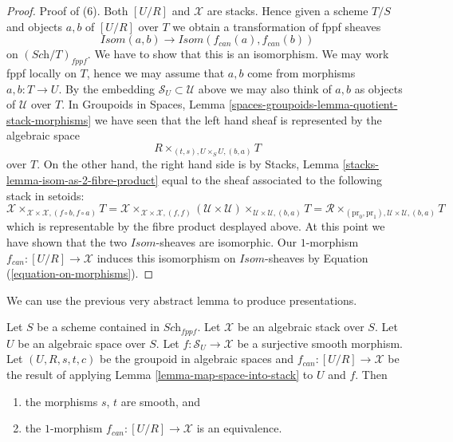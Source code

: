 \begin{proof}
\medskip\noindent
Proof of (6). Both $[U/R]$ and $\mathcal{X}$ are stacks.
Hence given a scheme $T/S$ and objects $a, b$ of $[U/R]$
over $T$ we obtain a transformation of fppf sheaves
$$
\mathit{Isom}(a, b) \longrightarrow \mathit{Isom}(f_{can}(a), f_{can}(b))
$$
on $(\textit{Sch}/T)_{fppf}$. We have to show that this is an
isomorphism. We may work fppf locally on $T$, hence we may assume that
$a, b$ come from morphisms $a, b : T \to U$. By the embedding
$\mathcal{S}_U \subset \mathcal{U}$ above we may also think of $a, b$ as
objects of $\mathcal{U}$ over $T$. In
Groupoids in Spaces,
Lemma \ref{spaces-groupoids-lemma-quotient-stack-morphisms}
we have seen that the left hand sheaf is represented by the algebraic space
$$
R \times_{(t, s), U \times_S U, (b, a)} T
$$
over $T$. On the other hand, the right hand side is by
Stacks, Lemma \ref{stacks-lemma-isom-as-2-fibre-product}
equal to the sheaf associated to the following stack in setoids:
$$
\mathcal{X}
\times_{\mathcal{X} \times \mathcal{X}, (f \circ b, f \circ a)} T =
\mathcal{X}
\times_{\mathcal{X} \times \mathcal{X}, (f, f)}
(\mathcal{U} \times \mathcal{U})
\times_{\mathcal{U} \times \mathcal{U}, (b, a)} T =
\mathcal{R}
\times_{(\text{pr}_0, \text{pr}_1), \mathcal{U} \times \mathcal{U}, (b, a)} T
$$
which is representable by the fibre product desplayed above.
At this point we have shown that the two $\mathit{Isom}$-sheaves
are isomorphic. Our $1$-morphism $f_{can} : [U/R] \to \mathcal{X}$ induces
this isomorphism on $\mathit{Isom}$-sheaves by
Equation (\ref{equation-on-morphisms}).
\end{proof}

\noindent
We can use the previous very abstract lemma to produce
presentations.

\begin{lemma}
\label{lemma-stack-presentation}
Let $S$ be a scheme contained in $\textit{Sch}_{fppf}$.
Let $\mathcal{X}$ be an algebraic stack over $S$.
Let $U$ be an algebraic space over $S$.
Let $f : \mathcal{S}_U \to \mathcal{X}$ be a surjective smooth morphism.
Let $(U, R, s, t, c)$ be the groupoid in algebraic spaces
and $f_{can} : [U/R] \to \mathcal{X}$ be the result of applying
Lemma \ref{lemma-map-space-into-stack}
to $U$ and $f$. Then
\begin{enumerate}
\item the morphisms $s$, $t$ are smooth, and
\item the $1$-morphism $f_{can} : [U/R] \to \mathcal{X}$
is an equivalence.
\end{enumerate}
\end{lemma}

